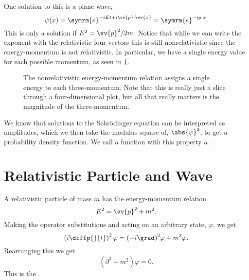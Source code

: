 \documentclass[fleqn]{NotesClass}
\newcommand{\dalembertian}{\partial^2}
\newcommand{\e}{\symrm{e}}
\begin{document}
    One solution to this is a plane wave,
    \begin{equation}
        \psi(x) = \e^{-iEt + i\vv{p} \cdot \vv{x}} = \e^{-ip\cdot x}.
    \end{equation}
    This is only a solution if \(E^2 = \vv{p}^2/2m\).
    Notice that while we can write the exponent with the relativistic four-vectors this is still nonrelativistic since the energy-momentum is not relativistic.
    In particular, we have a single energy value for each possible momentum, as seen in \cref{fig:energy-momentum relation nonrelativistic}.
    
    \begin{figure}
        \caption[Nonrelativistic energy-momentum relation.]{The nonrelativistic energy-momentum relation assigns a single energy to each three-momentum. Note that this is really just a slice through a four-dimensional plot, but all that really matters is the magnitude of the three-momentum.}
        \label{fig:energy-momentum relation nonrelativistic}
    \end{figure}
    
    We know that solutions to the Schrödinger equation can be interpreted as amplitudes, which we then take the modulus square of, \(\abs{\psi}^2\), to get a probability density function.
    We call a function with this property a .
    
    \section{Relativistic Particle and Wave}
    A relativistic particle of mass \(m\) has the energy-momentum relation
    \begin{equation}
        E^2 = \vv{p}^2 + m^2.
    \end{equation}
    Making the operator substitutions and acting on an arbitrary state, \(\varphi\), we get
    \begin{equation}
        \left( i\diffp{}{t} \right)^2\varphi = (-i\grad)^2\varphi + m^2\varphi.
    \end{equation}
    Rearranging this we get
    \begin{equation}
        (\dalembertian + m^2)\varphi = 0.
    \end{equation}
    This is the .
    
\end{document}

